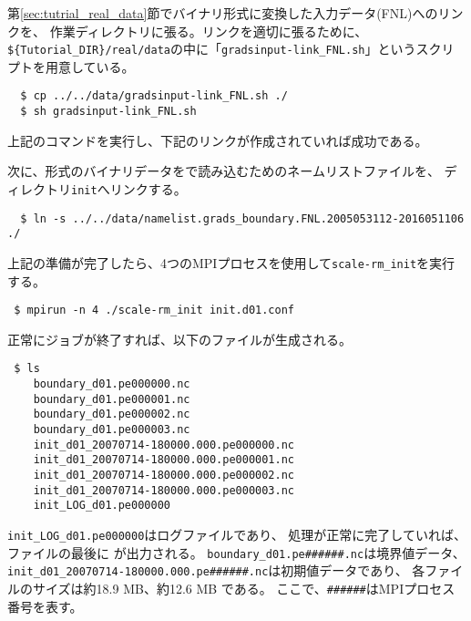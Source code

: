 第\ref{sec:tutrial_real_data}節でバイナリ形式に変換した入力データ(FNL)へのリンクを、
作業ディレクトリに張る。リンクを適切に張るために、\verb|${Tutorial_DIR}/real/data|の中に「\verb|gradsinput-link_FNL.sh|」というスクリプトを用意している。
\begin{verbatim}
  $ cp ../../data/gradsinput-link_FNL.sh ./
  $ sh gradsinput-link_FNL.sh
\end{verbatim}
上記のコマンドを実行し、下記のリンクが作成されていれば成功である。

次に、{\grads}形式のバイナリデータを{\scalelib}で読み込むためのネームリストファイルを、
ディレクトリ\verb|init|へリンクする。
\begin{verbatim}
  $ ln -s ../../data/namelist.grads_boundary.FNL.2005053112-2016051106 ./
\end{verbatim}
%
上記の準備が完了したら、4つのMPIプロセスを使用して\verb|scale-rm_init|を実行する。
\begin{verbatim}
 $ mpirun -n 4 ./scale-rm_init init.d01.conf
\end{verbatim}

正常にジョブが終了すれば、以下のファイルが生成される。
\begin{verbatim}
 $ ls
    boundary_d01.pe000000.nc
    boundary_d01.pe000001.nc
    boundary_d01.pe000002.nc
    boundary_d01.pe000003.nc
    init_d01_20070714-180000.000.pe000000.nc
    init_d01_20070714-180000.000.pe000001.nc
    init_d01_20070714-180000.000.pe000002.nc
    init_d01_20070714-180000.000.pe000003.nc
    init_LOG_d01.pe000000
\end{verbatim}
\verb|init_LOG_d01.pe000000|はログファイルであり、
処理が正常に完了していれば、ファイルの最後に
が出力される。
\verb|boundary_d01.pe######.nc|は境界値データ、
\verb|init_d01_20070714-180000.000.pe######.nc|は初期値データであり、
各ファイルのサイズは約18.9 MB、約12.6 MB である。
ここで、\verb|######|はMPIプロセス番号を表す。

